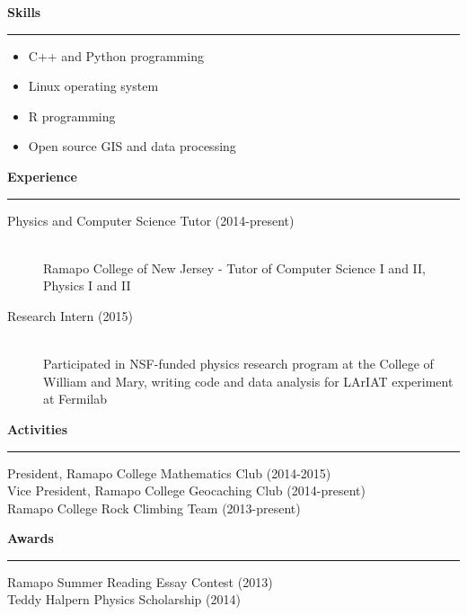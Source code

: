 \documentclass[letterpaper,10pt]{article}
\begin{document}
 \vspace{4 mm}
  
 \large
 \textbf{Skills}
 \vspace{1 mm}
 \hrule
 \normalsize
 
 \begin{multicols}{2}
  \begin{itemize}
   \item C++ and Python programming
   \item Linux operating system
   \item R programming
   \item Open source GIS and data processing
  \end{itemize}
 \end{multicols}
 
 \vspace{4 mm}

 \large
 \textbf{Experience}
 \vspace{1 mm}
 \hrule
 \normalsize
 
 \begin{description}
  \item[Physics and Computer Science Tutor (2014-present)] \hfill \\
   Ramapo College of New Jersey - Tutor of Computer Science I and II, Physics I and II
   
  \item[Research Intern (2015)] \hfill \\
   Participated in NSF-funded physics research program at the College of William and Mary, writing code and data analysis for LArIAT experiment at Fermilab
 \end{description}
 
 \vspace{4 mm}

 \large
 \textbf{Activities}
 \vspace{1 mm}
 \hrule
 \normalsize
 
 \begin{description}
  \item[President, Ramapo College Mathematics Club (2014-2015)]
  \item[Vice President, Ramapo College Geocaching Club (2014-present)]
  \item[Ramapo College Rock Climbing Team (2013-present)]
 \end{description}
 
 \large
 \textbf{Awards}
 \vspace{1 mm}
 \hrule
 \normalsize
 
 \begin{description}
  \item[Ramapo Summer Reading Essay Contest (2013)]
  \item[Teddy Halpern Physics Scholarship (2014)]
 \end{description}
\end{document}
